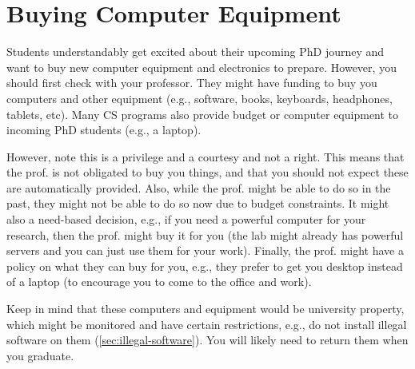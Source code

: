 \documentclass[oneside,11pt,dvipsnames]{book}
\def\sectioninfo#1{%
  \addcontentsline{toc}{sectioninfo}{%
    \noexpand\numberline{}\color{black}{#1}}%
}
\newcommand{\mycomment}[3][\color{blue}]{{#1{{#2}: {#3}}}}
\newcommand{\tvn}[1]{\mycomment{TVN}{#1}}{}
\begin{document}



\section{Buying Computer Equipment}\label{sec:buying-equipment}
\sectioninfo{Ask your prof. if they can buy computer equipment and such for your research.}

Students understandably get excited about their upcoming PhD journey and want to buy new computer equipment and electronics to prepare. However, you should first check with your professor.  They might have funding to buy you computers and other equipment (e.g., software, books, keyboards, headphones, tablets, etc). Many CS programs also provide budget or computer equipment to incoming PhD students (e.g., a laptop). 

However, note this is a privilege and a courtesy and not a right.  This means that the prof. is not obligated to buy you things, and that you should not expect these are automatically provided.  Also, while the prof. might be able to do so in the past, they might not be able to do so now due to budget constraints.  It might also a need-based decision, e.g., if you need a powerful computer for your research, then the prof. might buy it for you (the lab might already has powerful servers and you can just use them for your work). Finally, the prof. might have a policy on what they can buy for you, e.g., they prefer to get you desktop instead of a laptop (to encourage you to come to the office and work).

Keep in mind that these computers and equipment would be university property, which might be monitored and have certain restrictions, e.g., do not install illegal software on them (\autoref{sec:illegal-software}).  You will likely need to return them when you graduate. 
\end{document}

